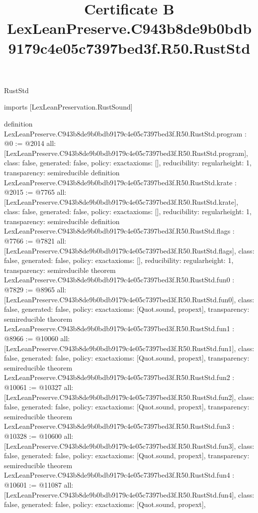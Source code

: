 \begin{lexlean}{RustStd}
\title{Certificate B LexLeanPreserve.C943b8de9b0bdb9179c4e05c7397bed3f.R50.RustStd}
\begin{coremodule}
imports [LexLeanPreservation.RustSound]

definition LexLeanPreserve.C943b8de9b0bdb9179c4e05c7397bed3f.R50.RustStd.program : @0 := @2014 {
  all: [LexLeanPreserve.C943b8de9b0bdb9179c4e05c7397bed3f.R50.RustStd.program],
  class: false,
  generated: false,
  policy: exact{axioms: []},
  reducibility: regular{height: 1},
  transparency: semireducible
}
definition LexLeanPreserve.C943b8de9b0bdb9179c4e05c7397bed3f.R50.RustStd.krate : @2015 := @7765 {
  all: [LexLeanPreserve.C943b8de9b0bdb9179c4e05c7397bed3f.R50.RustStd.krate],
  class: false,
  generated: false,
  policy: exact{axioms: []},
  reducibility: regular{height: 1},
  transparency: semireducible
}
definition LexLeanPreserve.C943b8de9b0bdb9179c4e05c7397bed3f.R50.RustStd.flags : @7766 := @7821 {
  all: [LexLeanPreserve.C943b8de9b0bdb9179c4e05c7397bed3f.R50.RustStd.flags],
  class: false,
  generated: false,
  policy: exact{axioms: []},
  reducibility: regular{height: 1},
  transparency: semireducible
}
theorem LexLeanPreserve.C943b8de9b0bdb9179c4e05c7397bed3f.R50.RustStd.fun0 : @7829 := @8965 {
  all: [LexLeanPreserve.C943b8de9b0bdb9179c4e05c7397bed3f.R50.RustStd.fun0],
  class: false,
  generated: false,
  policy: exact{axioms: [Quot.sound, propext]},
  transparency: semireducible
}
theorem LexLeanPreserve.C943b8de9b0bdb9179c4e05c7397bed3f.R50.RustStd.fun1 : @8966 := @10060 {
  all: [LexLeanPreserve.C943b8de9b0bdb9179c4e05c7397bed3f.R50.RustStd.fun1],
  class: false,
  generated: false,
  policy: exact{axioms: [Quot.sound, propext]},
  transparency: semireducible
}
theorem LexLeanPreserve.C943b8de9b0bdb9179c4e05c7397bed3f.R50.RustStd.fun2 : @10061 := @10327 {
  all: [LexLeanPreserve.C943b8de9b0bdb9179c4e05c7397bed3f.R50.RustStd.fun2],
  class: false,
  generated: false,
  policy: exact{axioms: [Quot.sound, propext]},
  transparency: semireducible
}
theorem LexLeanPreserve.C943b8de9b0bdb9179c4e05c7397bed3f.R50.RustStd.fun3 : @10328 := @10600 {
  all: [LexLeanPreserve.C943b8de9b0bdb9179c4e05c7397bed3f.R50.RustStd.fun3],
  class: false,
  generated: false,
  policy: exact{axioms: [Quot.sound, propext]},
  transparency: semireducible
}
theorem LexLeanPreserve.C943b8de9b0bdb9179c4e05c7397bed3f.R50.RustStd.fun4 : @10601 := @11087 {
  all: [LexLeanPreserve.C943b8de9b0bdb9179c4e05c7397bed3f.R50.RustStd.fun4],
  class: false,
  generated: false,
  policy: exact{axioms: [Quot.sound, propext]},
}
\end{coremodule}
\end{lexlean}
